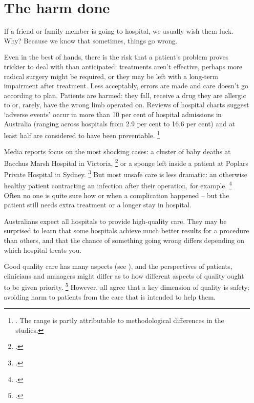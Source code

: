 \documentclass[FrontPage]{grattan}
\begin{document}
\contentspage


\listoffigures

\chapter{The harm done}\label{chap:the-harm-done}

If a friend or family member is going to hospital, we usually wish them luck.
Why? Because we know that sometimes, things go wrong.

Even in the best of hands, there is the risk that a patient's problem proves trickier to deal with than anticipated: treatments aren't effective, perhaps more radical surgery might be required, or they may be left with a long-term impairment after treatment.
Less acceptably, errors are made and care doesn't go according to plan.
Patients are harmed: they fall, receive a drug they are allergic to or, rarely, have the wrong limb operated on.
Reviews of hospital charts suggest `adverse events' occur in more than 10 per cent of hospital admissions in Australia (ranging across hospitals from 2.9 per cent to 16.6 per cent) and at least half are considered to have been preventable.%
	\footnote{\textcite{baines2015effective}.
	The range is partly attributable to methodological differences in the studies.}

Media reports focus on the most shocking cases: a cluster of baby deaths at Bacchus Marsh Hospital in Victoria,%
	\footcite{Duckett-Review-2016-Quality-assurance-in-Vic}
or a sponge left inside a patient at Poplars Private Hospital in Sydney.%
	\footcite{Courts-2011-SMH-Woman-to-sue-after-sponge-left-in-body}
But most unsafe care is less dramatic: an otherwise healthy patient contracting an infection after their operation, for example.%
	\footcite{Vincent-2016-Safer-Healthcare}
Often no one is quite sure how or when a complication happened -- but the patient still needs extra treatment or a longer stay in hospital.

Australians expect all hospitals to provide high-quality care.
They may be surprised to learn that some hospitals achieve much better results for a procedure than others, and that the chance of something going wrong differs depending on which hospital treats you.

Good quality care has many aspects (see ), and the perspectives of patients, clinicians and managers might differ as to how different aspects of quality ought to be given priority.%
	\footcite{Duckett-Ward-2008-Robust-performance-benchmarks}
However, all agree that a key dimension of quality is safety; avoiding harm to patients from the care that is intended to help them.
\end{document}
